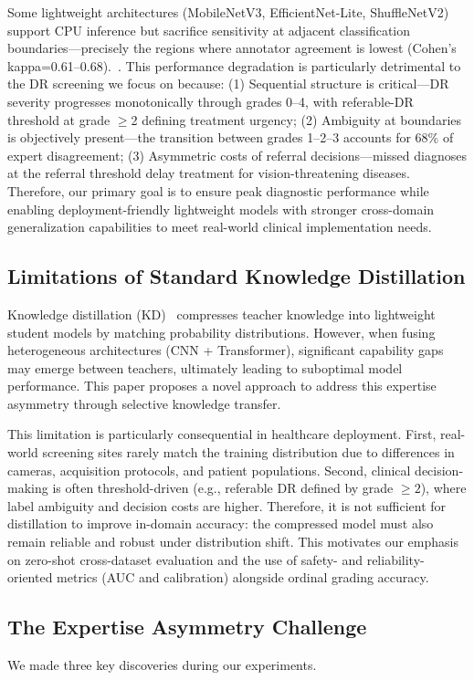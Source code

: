 \documentclass{article}
\begin{document}
Some lightweight architectures (MobileNetV3, EfficientNet-Lite, ShuffleNetV2)~\cite{howard2017mobilenets,zhang2018shufflenet} support CPU inference but sacrifice sensitivity at adjacent classification boundaries—precisely the regions where annotator agreement is lowest (Cohen's kappa=0.61–0.68).~\cite{krause2018grader}. This performance degradation is particularly detrimental to the DR screening we focus on because: (1) Sequential structure is critical—DR severity progresses monotonically through grades 0–4, with referable-DR threshold at grade $\geq$2 defining treatment urgency; (2) Ambiguity at boundaries is objectively present—the transition between grades 1–2–3 accounts for 68\% of expert disagreement; (3) Asymmetric costs of referral decisions—missed diagnoses at the referral threshold delay treatment for vision-threatening diseases. Therefore, our primary goal is to ensure peak diagnostic performance while enabling deployment-friendly lightweight models with stronger cross-domain generalization capabilities to meet real-world clinical implementation needs.

\subsection{Limitations of Standard Knowledge Distillation}
Knowledge distillation (KD)~\cite{hinton2015distilling} compresses teacher knowledge into lightweight student models by matching probability distributions. However, when fusing heterogeneous architectures (CNN + Transformer), significant capability gaps may emerge between teachers, ultimately leading to suboptimal model performance. This paper proposes a novel approach to address this expertise asymmetry through selective knowledge transfer.

This limitation is particularly consequential in healthcare deployment. First, real-world screening sites rarely match the training distribution due to differences in cameras, acquisition protocols, and patient populations. Second, clinical decision-making is often threshold-driven (e.g., referable DR defined by grade $\geq 2$), where label ambiguity and decision costs are higher. Therefore, it is not sufficient for distillation to improve in-domain accuracy: the compressed model must also remain reliable and robust under distribution shift. This motivates our emphasis on zero-shot cross-dataset evaluation and the use of safety- and reliability-oriented metrics (AUC and calibration) alongside ordinal grading accuracy.

\subsection{The Expertise Asymmetry Challenge}
We made three key discoveries during our experiments.
\end{document}

